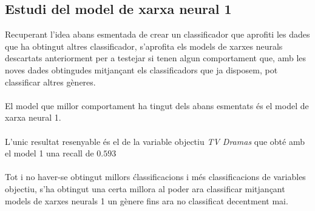 \documentclass[a4paper, 11pt]{article}
\begin{document}
\subsection{Estudi del model de xarxa neural 1}
Recuperant l'idea abans esmentada de crear un classificador que aprofiti les dades que ha obtingut altres classificador, s'aprofita els models de xarxes neurals descartats anteriorment per a testejar si tenen algun comportament que, amb les noves dades obtingudes mitjançant els classificadors que ja disposem, pot classificar altres gèneres.\\\\
El model que millor comportament ha tingut dels abans esmentats és el model de xarxa neural 1.\\\\
L'unic resultat resenyable és el de la variable objectiu \textit{TV Dramas} que obté amb el model 1 una recall de $0.593$\\\\
Tot i no haver-se obtingut millors ćlassificacions i més classificacions de variables objectiu, s'ha obtingut una certa millora al poder ara classificar mitjançant models de xarxes neurals 1 un gènere fins ara no classificat decentment mai.
\end{document}
